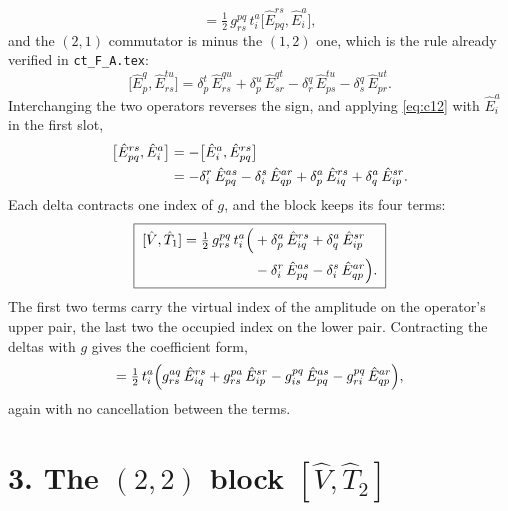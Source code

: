 \documentclass[11pt]{article}
\newcommand{\E}[2]{\hat E^{#1}_{#2}}
\newcommand{\occ}{i}
\newcommand{\vir}{a}
\begin{document}
\begin{equation}
  [\hat V,\hat T_1]
   =\tfrac12\,g^{pq}_{rs}\,t^\vir_\occ
     \bigl[\E{rs}{pq},\E{\vir}{\occ}\bigr],
  \label{eq:t1setup}
\end{equation}
and the $(2,1)$ commutator is minus the $(1,2)$ one, which is the rule already
verified in \texttt{ct\_F\_A.tex}:
\begin{equation}
  \bigl[\E{q}{p},\E{tu}{rs}\bigr]
   =\delta^t_p\,\E{qu}{rs}+\delta^u_p\,\E{qt}{sr}
    -\delta^q_r\,\E{tu}{ps}-\delta^q_s\,\E{ut}{pr}.
  \label{eq:c12}
\end{equation}
Interchanging the two operators reverses the sign, and applying
\eqref{eq:c12} with $\E{\vir}{\occ}$ in the first slot,
\begin{align}
  \bigl[\E{rs}{pq},\E{\vir}{\occ}\bigr]
   &=-\bigl[\E{\vir}{\occ},\E{rs}{pq}\bigr]\notag\\
   &=-\delta^r_\occ\,\E{\vir s}{pq}-\delta^s_\occ\,\E{\vir r}{qp}
     +\delta^\vir_p\,\E{rs}{\occ q}+\delta^\vir_q\,\E{sr}{\occ p}.
  \label{eq:c21apply}
\end{align}
Each delta contracts one index of $g$, and the block keeps its four terms:
\begin{equation}
  \boxed{\;
  \begin{aligned}
    [\hat V,\hat T_1]=\tfrac12\,g^{pq}_{rs}\,t^\vir_\occ\Bigl(
     &+\delta^\vir_p\,\E{rs}{\occ q}
      +\delta^\vir_q\,\E{sr}{\occ p}\\
     &-\delta^r_\occ\,\E{\vir s}{pq}
      -\delta^s_\occ\,\E{\vir r}{qp}\Bigr).
  \end{aligned}\;}
  \label{eq:VT1}
\end{equation}
The first two terms carry the virtual index of the amplitude on the operator's
upper pair, the last two the occupied index on the lower pair. Contracting the
deltas with $g$ gives the coefficient form,
\begin{equation}
  [\hat V,\hat T_1]
   =\tfrac12\,t^\vir_\occ\Bigl(
     g^{\vir q}_{rs}\,\E{rs}{\occ q}+g^{p\vir}_{rs}\,\E{sr}{\occ p}
     -g^{pq}_{\occ s}\,\E{\vir s}{pq}-g^{pq}_{r\occ}\,\E{\vir r}{qp}\Bigr),
  \label{eq:VT1c}
\end{equation}
again with no cancellation between the terms.

\section*{3. The \texorpdfstring{$(2,2)$}{(2,2)} block
\texorpdfstring{$[\hat V,\hat T_2]$}{[V,T2]}}
\end{document}
